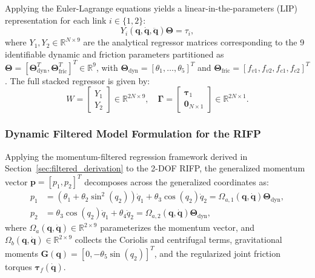 \documentclass[lettersize,journal]{IEEEtran}
\begin{document}
Applying the Euler-Lagrange equations yields a linear-in-the-parameters (LIP) representation for each link $i \in \{1, 2\}$:
\begin{equation}
    Y_i(\bm{q}, \dot{\bm{q}}, \ddot{\bm{q}}) \bm{\Theta} = \tau_i,
    \label{eq:furuta_link_reg}
\end{equation}
where $Y_1, Y_2 \in \mathbb{R}^{N \times 9}$ are the analytical regressor matrices corresponding to the 9 identifiable dynamic and friction parameters partitioned as $\bm{\Theta} = [\bm{\Theta}_{\text{dyn}}^T, \bm{\Theta}_{\text{fric}}^T]^T \in \mathbb{R}^9$, with $\bm{\Theta}_{\text{dyn}} = [\theta_1, \dots, \theta_5]^T$ and $\bm{\Theta}_{\text{fric}} = [f_{v1}, f_{v2}, f_{c1}, f_{c2}]^T$. The full stacked regressor is given by:
\begin{equation}
    W = \begin{bmatrix} Y_1 \\ Y_2 \end{bmatrix} \in \mathbb{R}^{2N \times 9}, \quad \bm{\Gamma} = \begin{bmatrix} \bm{\tau}_1 \\ \mathbf{0}_{N \times 1} \end{bmatrix} \in \mathbb{R}^{2N \times 1}.
    \label{eq:furuta_stacked}
\end{equation}

\subsubsection{Dynamic Filtered Model Formulation for the RIFP}
Applying the momentum-filtered regression framework derived in Section~\ref{sec:filtered_derivation} to the 2-DOF RIFP, the generalized momentum vector $\bm{p} = [p_1, p_2]^T$ decomposes across the generalized coordinates as:
\begin{align}
    p_1 &= (\theta_1 + \theta_2 \sin^2(q_2))\dot{q}_1 + \theta_3 \cos(q_2)\dot{q}_2 = \Omega_{a,1}(\bm{q}, \dot{\bm{q}})\bm{\Theta}_{\text{dyn}}, \label{eq:furuta_p1} \\
    p_2 &= \theta_3 \cos(q_2)\dot{q}_1 + \theta_4 \dot{q}_2 = \Omega_{a,2}(\bm{q}, \dot{\bm{q}})\bm{\Theta}_{\text{dyn}}, \label{eq:furuta_p2}
\end{align}
where $\Omega_a(\bm{q}, \dot{\bm{q}}) \in \mathbb{R}^{2 \times 9}$ parameterizes the momentum vector, and $\Omega_b(\bm{q}, \dot{\bm{q}}) \in \mathbb{R}^{2 \times 9}$ collects the Coriolis and centrifugal terms, gravitational moments $\bm{G}(\bm{q}) = [0, -\theta_5 \sin(q_2)]^T$, and the regularized joint friction torques $\bm{\tau}_f(\dot{\bm{q}})$.
\end{document}
